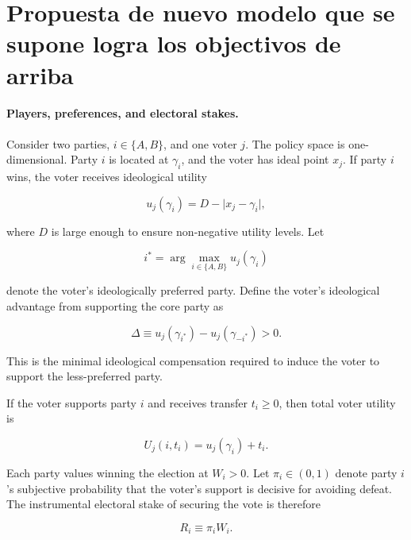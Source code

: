 \documentclass[11pt]{article}
\begin{document}
\section{Propuesta de nuevo modelo que se supone logra los objectivos de arriba}


\paragraph{Players, preferences, and electoral stakes.}

Consider two parties, $i\in\{A,B\}$, and one voter $j$. The policy space is one-dimensional. Party $i$ is located at $\gamma_i$, and the voter has ideal point $x_j$. If party $i$ wins, the voter receives ideological utility

\begin{equation}
u_j(\gamma_i)=D-\lvert x_j-\gamma_i\rvert,
\end{equation}

where $D$ is large enough to ensure non-negative utility levels. Let

\begin{equation}
i^\ast=\arg\max_{i\in\{A,B\}} u_j(\gamma_i)
\end{equation}

denote the voter's ideologically preferred party. Define the voter's ideological advantage from supporting the core party as

\begin{equation}
\Delta\equiv u_j(\gamma_{i^\ast})-u_j(\gamma_{-i^\ast})>0.
\end{equation}

This is the minimal ideological compensation required to induce the voter to support the less-preferred party.

If the voter supports party $i$ and receives transfer $t_i\geq 0$, then total voter utility is

\begin{equation}
U_j(i,t_i)=u_j(\gamma_i)+t_i.
\end{equation}

Each party values winning the election at $W_i>0$. Let $\pi_i\in(0,1)$ denote party $i$'s subjective probability that the voter's support is decisive for avoiding defeat. The instrumental electoral stake of securing the vote is therefore

\begin{equation}
R_i\equiv \pi_i W_i.
\end{equation}
\end{document}
